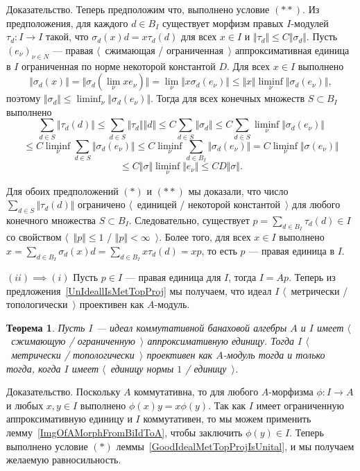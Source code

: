 \documentclass[12pt]{article}
\numberwithin{equation}{subsection}
\theoremstyle{plain}
\newtheorem{theorem}{Теорема}
\newenvironment{proof}{Доказательство.}{}
\begin{document}
\begin{fulltext}
\begin{proof}
Теперь предположим что, выполнено условие $(**)$. Из предположения, для каждого
$d\in B_I$ существует морфизм правых $I$-модулей $\tau_d:I\to I$ такой, что
$\sigma_d(x)d=x\tau_d(d)$ для всех $x\in I$ и $\Vert\tau_d\Vert\leq
C\Vert\sigma_d\Vert$. Пусть ${(e_\nu)}_{\nu\in N}$ --- правая $\langle$~сжимающая
/ ограниченная~$\rangle$ аппроксимативная единица в $I$ ограниченная по норме
некоторой константой $D$. Для всех $x\in I$ выполнено
$$
\Vert\sigma_d(x)\Vert
=\Vert\sigma_d(\lim_\nu x e_\nu)\Vert
=\lim_\nu\Vert x\sigma_d(e_\nu)\Vert
\leq\Vert x\Vert\liminf_\nu\Vert\sigma_d(e_\nu)\Vert,
$$
поэтому $\Vert\sigma_d\Vert\leq \liminf_\nu\Vert\sigma_d(e_\nu)\Vert$. Тогда для
всех конечных множеств $S\subset B_I$ выполнено
$$
\sum_{d\in S}\Vert \tau_d(d)\Vert
\leq \sum_{d\in S}\Vert \tau_d\Vert\Vert d\Vert
\leq C\sum_{d\in S}\Vert \sigma_d\Vert
\leq C\sum_{d\in S}\liminf_\nu \Vert \sigma_d(e_\nu)\Vert
$$
$$
\leq C\liminf_{\nu}\sum_{d\in S}\Vert \sigma_d(e_\nu) \Vert
\leq C\liminf_{\nu}\sum_{d\in B_I}\Vert \sigma_d(e_\nu) \Vert
=C\liminf_{\nu}\Vert\sigma(e_\nu)\Vert
$$
$$
\leq C\Vert\sigma\Vert\liminf_{\nu}\Vert e_\nu\Vert
\leq CD\Vert\sigma\Vert.
$$

Для обоих предположений $(*)$ и $(**)$ мы доказали, что число $\sum_{d\in
S}\Vert \tau_d(d)\Vert$ ограничено $\langle$~единицей / некоторой
константой~$\rangle$ для любого конечного множества $S\subset B_I$.
Следовательно, существует $p=\sum_{d\in B_I}\tau_d(d)\in I$ со свойством
$\langle$~$\Vert p\Vert\leq 1$ / $\Vert p\Vert< \infty$~$\rangle$. Более того,
для всех $x\in I$ выполнено $x=\sum_{d\in B_I}\sigma_d(x)d=\sum_{d\in
B_I}x\tau_d(d)=xp$, то есть $p$ --- правая единица в $I$. 

$(ii) \implies (i)$ Пусть $p\in I$  --- правая единица для $I$, тогда $I=Ap$.
Теперь из предложения~\ref{UnIdeallIsMetTopProj} мы получаем, что идеал $I$
$\langle$~метрически / топологически~$\rangle$ проективен как $A$-модуль.
\end{proof}

\begin{theorem}\label{GoodCommIdealMetTopProjIsUnital} Пусть $I$ --- идеал
коммутативной банаховой алгебры $A$ и $I$ имеет $\langle$~сжимающую /
ограниченную~$\rangle$ аппроксимативную единицу. Тогда $I$ $\langle$~метрически
/ топологически~$\rangle$ проективен как $A$-модуль тогда и только тогда, когда
$I$ имеет $\langle$~единицу нормы $1$ / единицу~$\rangle$.
\end{theorem} 
\begin{proof} Поскольку $A$ коммутативна, то для любого $A$-морфизма $\phi:I\to
A$ и любых $x,y\in I$ выполнено $\phi(x)y=x\phi(y)$. Так как $I$ имеет
ограниченную аппроксимативную единицу и $I$ коммутативен, то мы можем применить
лемму~\ref{ImgOfAMorphFromBiIdToA}, чтобы заключить $\phi(y)\in I$. Теперь
выполнено условие $(*)$ леммы~\ref{GoodIdealMetTopProjIsUnital}, и мы получаем
желаемую равносильность.
\end{proof}


\end{fulltext}
\end{document}
